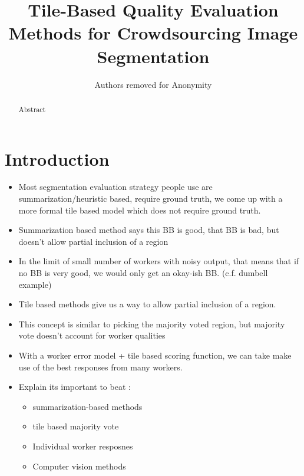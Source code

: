 \documentclass[letterpaper]{article} %
\begin{document}
 

%
\title{Tile-Based Quality Evaluation Methods for Crowdsourcing Image Segmentation}
\author{Authors removed for Anonymity}
\maketitle
\begin{abstract}
Abstract
\end{abstract}

\section{Introduction}
\begin{itemize}
\item Most segmentation evaluation strategy people use are summarization/heuristic based, require ground truth, we come up with a more formal tile based model which does not require ground truth.
\item Summarization based method says this BB is good, that BB is bad, but doesn’t allow partial inclusion of a region
\item In the limit of small number of workers with noisy output, that means that if no BB is very good, we would only get an okay-ish BB. (c.f. dumbell example)
\item Tile based methods give us a way to allow partial inclusion of a region. 
\item This concept is similar to picking the majority voted region, but majority vote doesn’t account for worker qualities
\item With a worker error model + tile based scoring function, we can take make use of the best responses from many workers.
\item Explain its important to beat : 
\begin{itemize}
\item summarization-based methods
\item tile based majority vote 
\item Individual worker resposnes
\item Computer vision methods 
\end{itemize}
\end{itemize}
\end{document}
